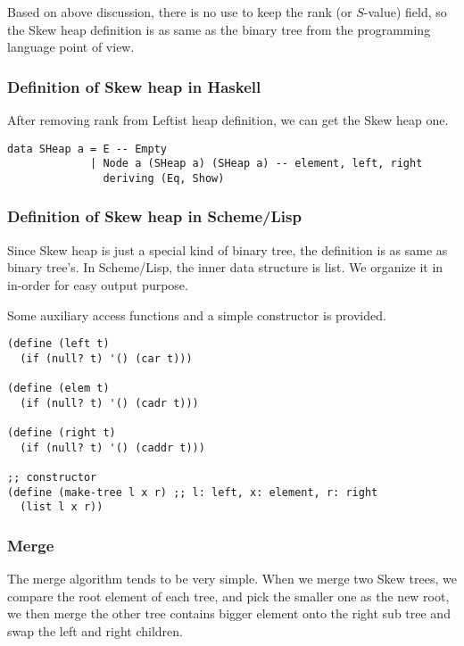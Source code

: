\documentclass{article}
\begin{document}
Based on above discussion, there is no use to keep the rank (or $S$-value)
field, so the Skew heap definition is as same as the binary tree from the
programming language point of view.

\subsubsection*{Definition of Skew heap in Haskell}

After removing rank from Leftist heap definition, we can get the Skew
heap one.

\lstset{language=Haskell}
\begin{lstlisting}
data SHeap a = E -- Empty
             | Node a (SHeap a) (SHeap a) -- element, left, right
               deriving (Eq, Show)
\end{lstlisting}

\subsubsection*{Definition of Skew heap in Scheme/Lisp}
\label{skew-heap-def-lisp}

Since Skew heap is just a special kind of binary tree, the definition is
as same as binary tree's. In Scheme/Lisp, the inner data structure is
list. We organize it in in-order for easy output purpose.

Some auxiliary access functions and a simple constructor is provided.

\lstset{language = lisp}
\begin{lstlisting}
(define (left t)
  (if (null? t) '() (car t)))

(define (elem t)
  (if (null? t) '() (cadr t)))

(define (right t)
  (if (null? t) '() (caddr t)))

;; constructor
(define (make-tree l x r) ;; l: left, x: element, r: right
  (list l x r))
\end{lstlisting}

\subsubsection{Merge}

The merge algorithm tends to be very simple. When we merge two Skew
trees, we compare the root element of each tree, and pick the smaller
one as the new root, we then merge the other tree contains bigger
element onto the right sub tree and swap the left and right children.
\end{document}
